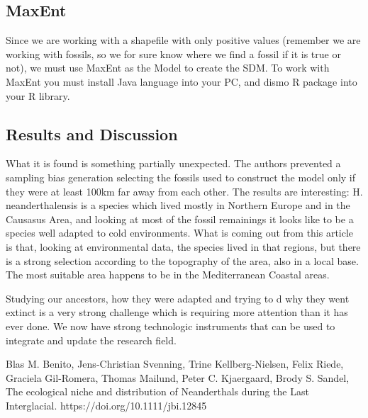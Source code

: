 \documentclass[a4paper,12pt]{article}
\begin{document}
    \subsection{MaxEnt}
        Since we are working with a shapefile with only positive values (remember we are working with fossils, so we for sure know where we find a fossil if it is true or not), we must use MaxEnt as the Model to create the SDM. To work with MaxEnt you must install Java language into your PC, and dismo R package into your R library. 
        
    \subsection{Results and Discussion}
        What it is found is something partially unexpected. The authors prevented a sampling bias generation selecting the fossils used to construct the model only if they were at least 100km far away from each other. The results are interesting: H. neanderthalensis is a species which lived mostly in Northern Europe and in the Causasus Area, and looking at most of the fossil remainings it looks like to be a species well adapted to cold environments. What is coming out from this article is that, looking at environmental data, the species lived in that regions, but there is a strong selection according to the topography of the area, also in a local base. The most suitable area happens to be in the Mediterranean Coastal areas. 
        
        Studying our ancestors, how they were adapted and trying to d why they went extinct is a very strong challenge which is requiring more attention than it has ever done. We now have strong technologic instruments that can be used to integrate and update the research field. 



\begin{thebibliography}{999}

Blas M. Benito, Jens-Christian Svenning, Trine Kellberg-Nielsen, Felix Riede, Graciela Gil-Romera, Thomas Mailund, Peter C. Kjaergaard, Brody S. Sandel, The ecological niche and distribution of Neanderthals during the Last Interglacial. https://doi.org/10.1111/jbi.12845


\end{thebibliography}
\end{document}

